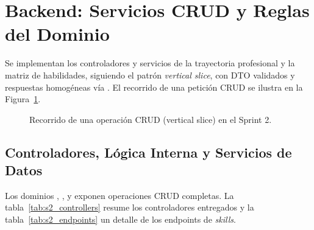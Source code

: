 \section{Backend: Servicios CRUD y Reglas del Dominio}
\label{sec:s2_backend}

Se implementan los controladores y servicios de la trayectoria profesional y la matriz de
habilidades, siguiendo el patrón \textit{vertical slice}, con DTO validados y respuestas
homogéneas vía . El recorrido de una petición CRUD se ilustra en la
Figura~\ref{fig:s2_crud}.\par

\begin{figure}[!ht]
    \centering
    \caption{Recorrido de una operación CRUD (vertical slice) en el Sprint 2.}
    \label{fig:s2_crud}
\end{figure}

\subsection{Controladores, Lógica Interna y Servicios de Datos}
\label{ssec:s2_be_controllers}
Los dominios , ,  y 
exponen operaciones CRUD completas. La tabla~\ref{tab:s2_controllers} resume los controladores
entregados y la tabla~\ref{tab:s2_endpoints} un detalle de los endpoints de \textit{skills}.

